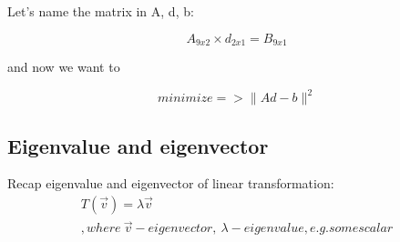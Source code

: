 \documentclass[11pt]{article}
\begin{document}
    Let's name the matrix in A, d, b:

    \[
        A_{9x2} \times d_{2x1} = B_{9x1}
    \]

    and now we want to

    \[
        minimize => \lVert{Ad - b}\rVert^2
    \]

    \subsection{Eigenvalue and eigenvector} \label{subsec:eigenvv}

    Recap eigenvalue and eigenvector of linear transformation:
    \begin{gather*}
        T(\vec{v}) = \lambda\vec{v} \\
        , where \ \vec{v} - eigenvector, \ \lambda - eigenvalue, e.g. some scalar
    \end{gather*}
\end{document}
